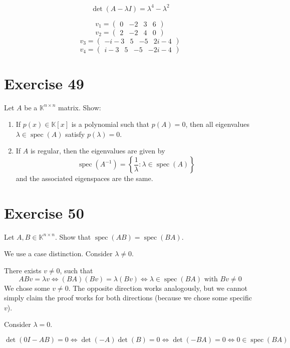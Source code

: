 \documentclass[a4paper]{article}
\theoremstyle{definition}
\newcommand\set[1]{\left\{#1\right\}}
\begin{document}
\[ \det(A - \lambda I) = \lambda^4 - \lambda^2 \]

\[ v_1 = \begin{pmatrix} 0 & -2 & 3 & 6 \end{pmatrix} \]
\[ v_2 = \begin{pmatrix} 2 & -2 & 4 & 0 \end{pmatrix} \]
\[ v_3 = \begin{pmatrix} -i-3 & 5 & -5 & 2i-4 \end{pmatrix} \]
\[ v_4 = \begin{pmatrix} i-3 & 5 & -5 & -2i-4 \end{pmatrix} \]

\section*{Exercise 49}
\begin{ex}
  Let $A$ be a $\mathbb K^{n\times n}$ matrix. Show:
  \begin{enumerate}
    \item If $p(x) \in \mathbb K[x]$ is a polynomial such that $p(A) = 0$, then all eigenvalues $\lambda \in \operatorname{spec}(A)$ satisfy $p(\lambda) = 0$.
    \item If $A$ is regular, then the eigenvalues are given by
      \[ \operatorname{spec}(A^{-1}) = \set{\frac1{\lambda} : \lambda \in \operatorname{spec}(A)} \]
      and the associated eigenspaces are the same.
  \end{enumerate}
\end{ex}

\section*{Exercise 50}
\begin{ex}
  Let $A, B \in \mathbb K^{n \times n}$. Show that $\operatorname{spec}(AB) = \operatorname{spec}(BA)$.
\end{ex}

We use a case distinction. Consider $\lambda \neq 0$.

There exists $v \neq 0$, such that
\[ AB v = \lambda v \iff (BA)(Bv) = \lambda (Bv) \iff \lambda \in \operatorname{spec}(BA) \text{ with } Bv \neq 0 \]
We chose some $v \neq 0$. The opposite direction works analogously, but we cannot simply claim the proof works for both directions (because we chose some specific $v$).

Consider $\lambda = 0$.

\[ \det(0I - AB) = 0 \iff \det(-A) \det(B) = 0 \iff \det(-BA) = 0 \iff 0 \in \operatorname{spec}(BA) \]
\end{document}
